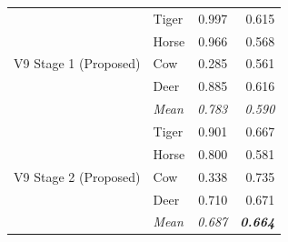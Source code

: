 \begin{table}[htbp]
\begin{tabular}{@{}llrr@{}}
    \midrule
    \multirow{5}{*}{V9 Stage 1 (Proposed)} & Tiger & 0.997 & 0.615 \\
    & Horse & 0.966 & 0.568 \\
    & Cow & 0.285 & 0.561 \\
    & Deer & 0.885 & 0.616 \\
    & \textit{Mean} & \textit{0.783} & \textit{0.590} \\
    \midrule
    \multirow{5}{*}{V9 Stage 2 (Proposed)} & Tiger & 0.901 & 0.667 \\
    & Horse & 0.800 & 0.581 \\
    & Cow & 0.338 & 0.735 \\
    & Deer & 0.710 & 0.671 \\
    & \textit{Mean} & \textit{0.687} & \textit{\textbf{0.664}} \\
    \bottomrule
  \end{tabular}
\end{table}

